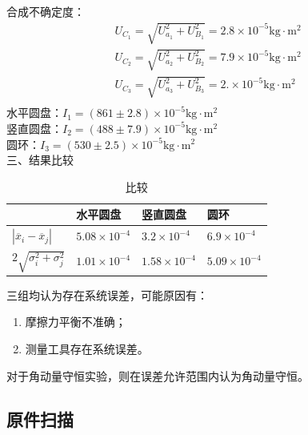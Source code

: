 \documentclass[dvipsnames, svgnames,a4paper,11pt]{article}
\begin{document}
合成不确定度：
\begin{align*}
	U_{C_1}=\sqrt{U_{a_1}^2+U_{B_1}^2}=2.8\times10^{-5}\text{kg}\cdot\text{m}^2\\
	U_{C_2}=\sqrt{U_{a_2}^2+U_{B_2}^2}=7.9\times10^{-5}\text{kg}\cdot\text{m}^2\\
	U_{C_3}=\sqrt{U_{a_3}^2+U_{B_3}^2}=2.\times10^{-5}\text{kg}\cdot\text{m}^2\\
\end{align*}
水平圆盘：$I_1=(861\pm2.8)\times10^{-5}\text{kg}\cdot\text{m}^2$\\
竖直圆盘：$I_2=(488\pm7.9)\times10^{-5}\text{kg}\cdot\text{m}^2$\\
圆环：$I_3=(530\pm2.5)\times10^{-5}\text{kg}\cdot\text{m}^2$\\
三、结果比较
\begin{table}[H]
	\renewcommand\arraystretch{1.7}
	\centering
    \caption{比较}
	\begin{tabularx}{\textwidth}{|X|X|X|X|}
	\hline
	&水平圆盘&竖直圆盘&圆环\\
	\hline
	$|\overline{x}_i-\overline{x}_j|$&$5.08\times10^{-4}$&$3.2\times10^{-4}$&$6.9\times10^{-4}$\\
	\hline
	$2\sqrt{\sigma_i^2+\sigma_j^2}$&$1.01\times10^{-4}$&$1.58\times10^{-4}$&$5.09\times10^{-4}$\\
	\hline
	\end{tabularx}
\end{table}
三组均认为存在系统误差，可能原因有：
\begin{enumerate}
	\item 摩擦力平衡不准确；
	\item 测量工具存在系统误差。
\end{enumerate}
对于角动量守恒实验，则在误差允许范围内认为角动量守恒。
\clearpage




\clearpage
\appendix
\appendixpage
\addappheadtotoc


%
\subsection*{原件扫描}

\end{document}
